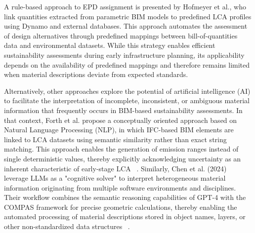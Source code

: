 \documentclass[10pt, a4paper, twocolumn]{article}
\begin{document}
A rule-based approach to EPD assignment is presented by Hofmeyer et al., who link quantities extracted from parametric BIM models to predefined LCA profiles using Dynamo and external databases. This approach automates the assessment of design alternatives through predefined mappings between bill-of-quantities data and environmental datasets. While this strategy enables efficient sustainability assessments during early infrastructure planning, its applicability depends on the availability of predefined mappings and therefore remains limited when material descriptions deviate from expected standards. ~\cite{J.HofmeyerK.ForthS.EsserA.Borrmann.}

Alternatively, other approaches explore the potential of artificial intelligence (AI) to facilitate the interpretation of incomplete, inconsistent, or ambiguous material information that frequently occurs in BIM-based sustainability assessments. In that context, Forth et al. propose a conceptually oriented approach based on Natural Language Processing (NLP), in which IFC-based BIM elements are linked to LCA datasets using semantic similarity rather than exact string matching. This approach enables the generation of emission ranges instead of single deterministic values, thereby explicitly acknowledging uncertainty as an inherent characteristic of early-stage LCA ~\cite{Forth.2023}. Similarly, Chen et al. (2024) leverage LLMs as a "cognitive solver" to interpret heterogeneous material information originating from multiple software environments and disciplines. Their workflow combines the semantic reasoning capabilities of GPT-4 with the COMPAS framework for precise geometric calculations, thereby enabling the automated processing of material descriptions stored in object names, layers, or other non-standardized data structures ~\cite{LiChenHeidiSilvennoinenCatherineDeWolfDanielHallTomVanMelePhilippeBlock.}.
\end{document}
